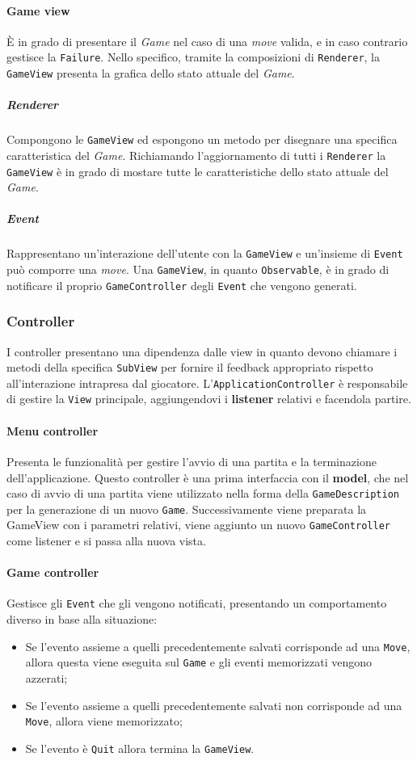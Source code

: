 \paragraph{Game view} 
%
È in grado di presentare il \textit{Game} nel caso di una \textit{move} valida, e in caso contrario gestisce la \texttt{Failure}.
%
Nello specifico, tramite la composizioni di \texttt{Renderer}, la \texttt{GameView} presenta la grafica dello stato attuale del \textit{Game}.
\subparagraph{Renderer}
%
Compongono le \texttt{GameView} ed espongono un metodo per disegnare una specifica caratteristica del \textit{Game}.
%
Richiamando l'aggiornamento di tutti i \texttt{Renderer} la \texttt{GameView} è in grado di mostare tutte le caratteristiche dello stato attuale del \textit{Game}.
\subparagraph{Event}
%
Rappresentano un'interazione dell'utente con la \texttt{GameView} e un'insieme di \texttt{Event} può comporre una \textit{move}.
%
Una \texttt{GameView}, in quanto \texttt{Observable}, è in grado di notificare il proprio \texttt{GameController} degli \texttt{Event} che vengono generati. 
\subsubsection{Controller}
I controller presentano una dipendenza dalle view in quanto devono chiamare i metodi della specifica \texttt{SubView} per fornire il feedback appropriato rispetto all'interazione intrapresa dal giocatore.
%
L'\texttt{ApplicationController} è responsabile di gestire la \texttt{View} principale, aggiungendovi i \textbf{listener} relativi e facendola partire.
\paragraph{Menu controller}
%
Presenta le funzionalità per gestire l'avvio di una partita e la terminazione dell'applicazione.
%
Questo controller è una prima interfaccia con il \textbf{model}, che nel caso di avvio di una partita viene utilizzato nella forma della \texttt{GameDescription} per la generazione di un nuovo \texttt{Game}.
%
Successivamente viene preparata la GameView con i parametri relativi, viene aggiunto un nuovo \texttt{GameController} come listener e si passa alla nuova vista.
\paragraph{Game controller}
%
Gestisce gli \texttt{Event} che gli vengono notificati, presentando un comportamento diverso in base alla situazione:
\begin{itemize}
    \item Se l'evento assieme a quelli precedentemente salvati corrisponde ad una \texttt{Move}, allora questa viene eseguita sul \texttt{Game} e gli eventi memorizzati vengono azzerati;
    \item Se l'evento assieme a quelli precedentemente salvati non corrisponde ad una \texttt{Move}, allora viene memorizzato;
    \item Se l'evento è \texttt{Quit} allora termina la \texttt{GameView}.
\end{itemize}

